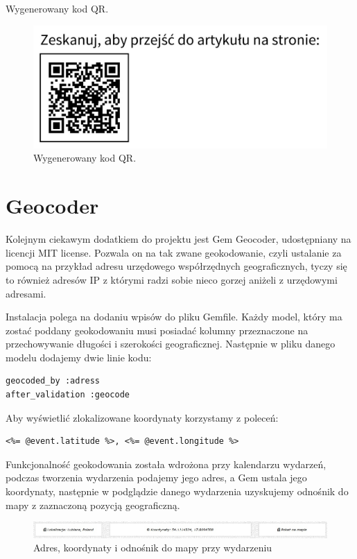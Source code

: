 \documentclass[openright]{xmgr}
\begin{document}
Wygenerowany kod QR.
\begin{figure}[!tbh]
\centering
\includegraphics[width=.6\linewidth]{fig/kodqr}
\caption{Wygenerowany kod QR.}
\end{figure}

\section{Geocoder}
Kolejnym ciekawym dodatkiem do projektu jest Gem Geocoder\cite{geocoder}, udostępniany na licencji MIT license. Pozwala on na tak zwane geokodowanie, czyli ustalanie za pomocą na przykład adresu  urzędowego współrzędnych geograficznych, tyczy się to również adresów IP z którymi radzi sobie nieco gorzej aniżeli z urzędowymi adresami.

Instalacja polega na dodaniu wpisów do pliku Gemfile. Każdy model, który ma zostać poddany geokodowaniu musi posiadać kolumny przeznaczone na przechowywanie długości i szerokości geograficznej. Następnie w pliku danego modelu dodajemy dwie linie kodu:
\begin{lstlisting}[language=ruby2, caption={Kod odpowiadający za geokodowanie}]
geocoded_by :adress
after_validation :geocode
\end{lstlisting}
Aby wyświetlić zlokalizowane koordynaty korzystamy z poleceń:
\begin{lstlisting}[language=ruby2, caption={Kod wyświetlający koordynaty}]
<%= @event.latitude %>, <%= @event.longitude %>
\end{lstlisting}
Funkcjonalność geokodowania została wdrożona przy kalendarzu wydarzeń, podczas tworzenia wydarzenia podajemy jego adres, a Gem ustala jego koordynaty, następnie w podglądzie danego wydarzenia uzyskujemy odnośnik do mapy z zaznaczoną pozycją geograficzną.

\begin{figure}[!tbh]
\centering
\includegraphics[width=\linewidth]{fig/geocoder-events}
\caption{Adres, koordynaty i odnośnik do mapy przy wydarzeniu}
\end{figure}
\end{document}
